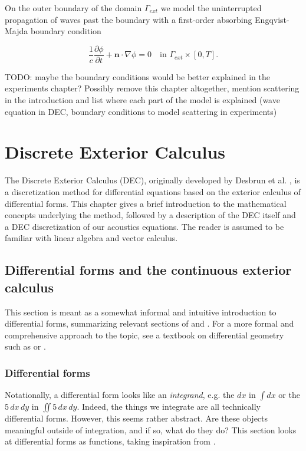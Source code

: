 \documentclass[utf8,english]{gradu3}
\begin{document}
On the outer boundary of the domain $\Gamma_{ext}$
we model the uninterrupted propagation of waves past the boundary
with a first-order absorbing Engqvist-Majda boundary condition
\parencite{engquist_absorbing_1977}

\[
  \frac{1}{c}\frac{\partial\phi}{\partial t} + \mathbf{n} \cdot \nabla\phi = 0
  \quad \text{in } \Gamma_{ext} \times [0, T].
\]


TODO: maybe the boundary conditions would be better explained
in the experiments chapter?
Possibly remove this chapter altogether,
mention scattering in the introduction
and list where each part of the model is explained
(wave equation in DEC, boundary conditions to model scattering in experiments)



\chapter{Discrete Exterior Calculus}

The Discrete Exterior Calculus (DEC),
originally developed by Desbrun et al. \parencite*{desbrun_discrete_2005},
is a discretization method for differential equations
based on the exterior calculus of differential forms.
This chapter gives a brief introduction to the mathematical concepts
underlying the method, followed by a description of the DEC itself
and a DEC discretization of our acoustics equations.
The reader is assumed to be familiar with linear algebra and vector calculus.

\section{Differential forms and the continuous exterior calculus}

This section is meant as a somewhat informal and intuitive introduction
to differential forms, summarizing relevant sections of
\parencite{blair_perot_differential_2014} and \parencite{crane_digital_2013}.
For a more formal and comprehensive approach to the topic,
see a textbook on differential geometry such as \parencite{lee_introduction_2012}
or \parencite{abraham_manifolds_2012}.

\subsection{Differential forms}

Notationally, a differential form looks like an \textit{integrand},
e.g. the $dx$ in $\int dx$ or the $5\,dx\,dy$ in $\iint 5\,dx\,dy$.
Indeed, the things we integrate are all technically differential forms.
However, this seems rather abstract.
Are these objects meaningful outside of integration,
and if so, what do they do?
This section looks at differential forms as functions,
taking inspiration from \parencite{crane_digital_2013}.
\end{document}
